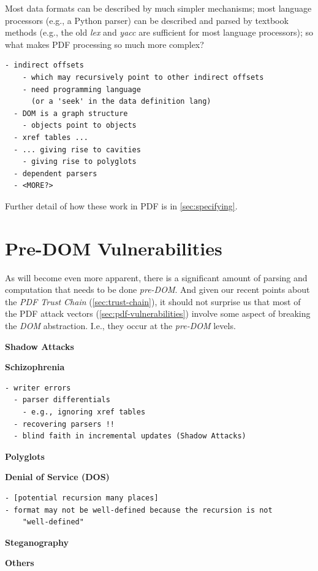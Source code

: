 Most data formats can be described by much simpler mechanisms;
most language processors (e.g., a Python parser) can be described and parsed by
textbook methods (e.g., the old \emph{lex} and \emph{yacc} are sufficient for
most language processors);
so what makes PDF processing so much more complex?
\begin{lstlisting}[style=meta]
  - indirect offsets
    - which may recursively point to other indirect offsets
    - need programming language
      (or a 'seek' in the data definition lang)
  - DOM is a graph structure
    - objects point to objects   
  - xref tables ...
  - ... giving rise to cavities
    - giving rise to polyglots
  - dependent parsers
  - <MORE?>
\end{lstlisting}

Further detail of how these work in PDF is in \cref{sec:specifying}.

\section{Pre-DOM Vulnerabilities }
\label{sec:predom-vulnerabilities}

As will become even more apparent, there is a significant amount of
parsing and computation that needs to be done \emph{pre-DOM}.
And given our recent points about the \emph{PDF Trust Chain}
(\cref{sec:trust-chain}),
it should not surprise us that most of the PDF attack vectors
(\cref{sec:pdf-vulnerabilities})
involve some aspect of breaking the \emph{DOM} abstraction.
I.e., they occur at the \emph{pre-DOM} levels.

{\bf{Shadow Attacks}} 

{\bf{Schizophrenia}} 
\begin{lstlisting}[style=meta]
  - writer errors
  - parser differentials
    - e.g., ignoring xref tables
  - recovering parsers !!
  - blind faith in incremental updates (Shadow Attacks)
\end{lstlisting}

{\bf{Polyglots}} 

{\bf{Denial of Service (DOS)}} 
%
\begin{lstlisting}[style=meta]
- [potential recursion many places]
- format may not be well-defined because the recursion is not
    "well-defined"
\end{lstlisting}

{\bf{Steganography}} 

{\bf{Others}} 
